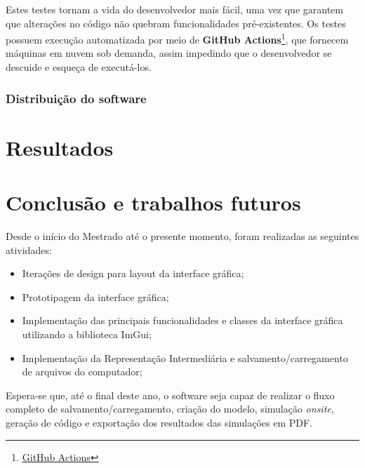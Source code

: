 \documentclass[
	12pt,				%
	openright,			%
	oneside,			%
	a4paper,			%
	main=brazil,
	english,			%
	]{ufsj-abntex2}
\begin{document}
Estes testes tornam a vida do desenvolvedor mais fácil, uma vez que garantem que alterações no código não quebram funcionalidades pré-existentes. Os testes possuem execução automatizada por meio de \textbf{GitHub Actions}\footnote{\href{https://github.com/features/actions}{GitHub Actions}}, que fornecem máquinas em nuvem sob demanda, assim impedindo que o desenvolvedor se descuide e esqueça de executá-los.

\subsection{Distribuição do software}


\chapter{Resultados}

\chapter{Conclusão e trabalhos futuros}
\label{chap:resultados}

Desde o início do Mestrado até o presente momento, foram realizadas as seguintes atividades: 
\begin{itemize}
    \item Iterações de design para layout da interface gráfica;
    \item Prototipagem da interface gráfica;
    \item Implementação das principais funcionalidades e classes da interface gráfica utilizando a biblioteca ImGui;
    \item Implementação da Representação Intermediária e salvamento/carregamento de arquivos do computador;
\end{itemize}

Espera-se que, até o final deste ano, o software seja capaz de realizar o fluxo completo de salvamento/carregamento, criação do modelo, simulação \textit{onsite}, geração de código e exportação dos resultados das simulações em PDF.
\end{document}
